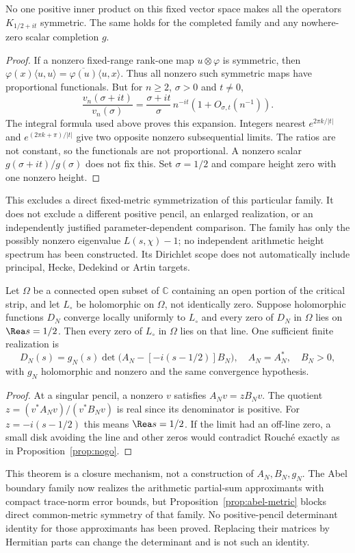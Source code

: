 \begin{proposition}\label{prop:abel-metric}
No one positive inner product on this fixed vector space makes all the operators $K_{1/2+it}$ symmetric. The same holds for the completed family and any nowhere-zero scalar completion $g$.
\end{proposition}
\begin{proof}
If a nonzero fixed-range rank-one map $u\otimes\varphi$ is symmetric, then
$\varphi(x)\langle u,u\rangle=\overline{\varphi(u)}\langle u,x\rangle$.
Thus all nonzero such symmetric maps have proportional functionals. But for $n\ge2$, $\sigma>0$ and $t\ne0$,
\[
 \frac{v_n(\sigma+it)}{v_n(\sigma)}
 =\frac{\sigma+it}{\sigma}\,n^{-it}(1+O_{\sigma,t}(n^{-1})).
\]
The integral formula used above proves this expansion. Integers nearest $e^{2\pi k/|t|}$ and $e^{(2\pi k+\pi)/|t|}$ give two opposite nonzero subsequential limits. The ratios are not constant, so the functionals are not proportional. A nonzero scalar $g(\sigma+it)/g(\sigma)$ does not fix this. Set $\sigma=1/2$ and compare height zero with one nonzero height.
\end{proof}
This excludes a direct fixed-metric symmetrization of this particular family. It does not exclude a different positive pencil, an enlarged realization, or an independently justified parameter-dependent comparison. The family has only the possibly nonzero eigenvalue $L(s,\chi)-1$; no independent arithmetic height spectrum has been constructed. Its Dirichlet scope does not automatically include principal, Hecke, Dedekind or Artin targets.

\begin{theorem}\label{thm:closure}
Let $\Omega$ be a connected open subset of $\mathbb C$ containing an open portion of the critical strip, and let $L_\circ$ be holomorphic on $\Omega$, not identically zero. Suppose holomorphic functions $D_N$ converge locally uniformly to $L_\circ$ and every zero of $D_N$ in $\Omega$ lies on $\Rea s=1/2$. Then every zero of $L_\circ$ in $\Omega$ lies on that line. One sufficient finite realization is
\[
 D_N(s)=g_N(s)\det\bigl(A_N-[-i(s-1/2)]B_N\bigr),
 \quad A_N=A_N^*,\quad B_N>0,
\]
with $g_N$ holomorphic and nonzero and the same convergence hypothesis.
\end{theorem}
\begin{proof}
At a singular pencil, a nonzero $v$ satisfies $A_Nv=zB_Nv$. The quotient $z=(v^*A_Nv)/(v^*B_Nv)$ is real since its denominator is positive. For $z=-i(s-1/2)$ this means $\Rea s=1/2$. If the limit had an off-line zero, a small disk avoiding the line and other zeros would contradict Rouch\'e exactly as in Proposition~\ref{prop:nogo}.
\end{proof}
This theorem is a closure mechanism, not a construction of $A_N,B_N,g_N$. The Abel boundary family now realizes the arithmetic partial-sum approximants with compact trace-norm error bounds, but Proposition~\ref{prop:abel-metric} blocks direct common-metric symmetry of that family. No positive-pencil determinant identity for those approximants has been proved. Replacing their matrices by Hermitian parts can change the determinant and is not such an identity.

